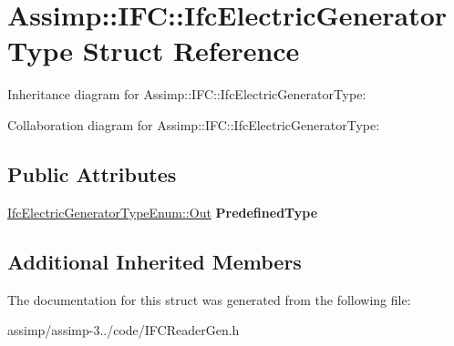 \hypertarget{struct_assimp_1_1_i_f_c_1_1_ifc_electric_generator_type}{\section{Assimp\+:\+:I\+F\+C\+:\+:Ifc\+Electric\+Generator\+Type Struct Reference}
\label{struct_assimp_1_1_i_f_c_1_1_ifc_electric_generator_type}
}


Inheritance diagram for Assimp\+:\+:I\+F\+C\+:\+:Ifc\+Electric\+Generator\+Type\+:


Collaboration diagram for Assimp\+:\+:I\+F\+C\+:\+:Ifc\+Electric\+Generator\+Type\+:
\subsection*{Public Attributes}
\begin{DoxyCompactItemize}
\item 
\hypertarget{struct_assimp_1_1_i_f_c_1_1_ifc_electric_generator_type_a1027a984ea03a11dda3e3724ede79bb5}{\hyperlink{classboost_1_1shared__ptr}{Ifc\+Electric\+Generator\+Type\+Enum\+::\+Out} {\bfseries Predefined\+Type}}\label{struct_assimp_1_1_i_f_c_1_1_ifc_electric_generator_type_a1027a984ea03a11dda3e3724ede79bb5}

\end{DoxyCompactItemize}
\subsection*{Additional Inherited Members}


The documentation for this struct was generated from the following file\+:\begin{DoxyCompactItemize}
\item 
assimp/assimp-\/3../code/I\+F\+C\+Reader\+Gen.\+h\end{DoxyCompactItemize}
